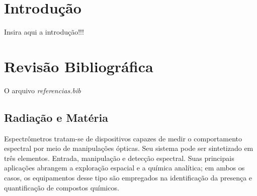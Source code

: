 \documentclass[oneside,openright,12pt]{ufsm_2021} %
\author{João Felipe Amaral Santiago}   %
\begin{document}
\pretextual  %


\chapter{Introdução}
\par Insira aqui a introdução!!!

\lipsum[1-5]



\chapter{Revisão Bibliográfica}
    \par O arquivo \textit{referencias.bib} 
    \section{Radiação e Matéria}
        \par Espectrômetros tratam-se de dispositivos capazes de medir o comportamento espectral por meio de manipulações ópticas. Seu sistema pode ser sintetizado em três elementos. Entrada, manipulação e detecção espectral. Suas principais aplicações abrangem a exploração espacial e a química analítica; em ambos os casos, os equipamentos desse tipo são empregados na identificação da presença e quantificação de compostos químicos. 
\end{document}
